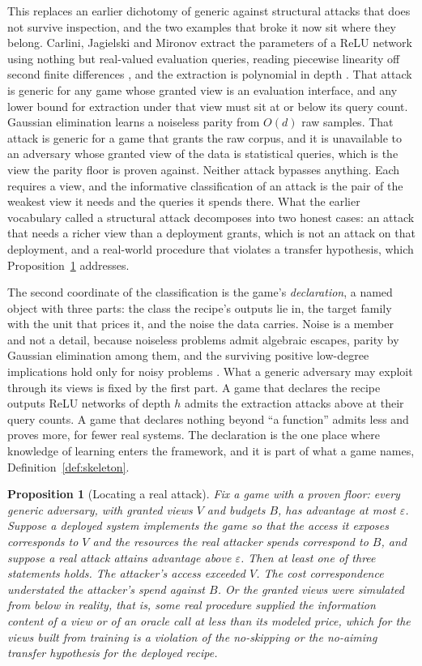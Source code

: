 \documentclass[11pt]{article}
\theoremstyle{definition}
\theoremstyle{plain}
\newtheorem{proposition}{Proposition}
\theoremstyle{remark}
\begin{document}
This replaces an earlier dichotomy of generic against structural attacks that
does not survive inspection, and the two examples that broke it now sit where
they belong. Carlini, Jagielski and Mironov extract the parameters of a ReLU
network using nothing but real-valued evaluation queries, reading piecewise
linearity off second finite differences \cite{CJM20}, and the extraction is
polynomial in depth \cite{CCHRSS24}. That attack is generic for any game whose
granted view is an evaluation interface, and any lower bound for extraction
under that view must sit at or below its query count. Gaussian elimination
learns a noiseless parity from $O(d)$ raw samples. That attack is generic for a
game that grants the raw corpus, and it is unavailable to an adversary whose
granted view of the data is statistical queries, which is the view the parity
floor is proven against. Neither attack bypasses anything. Each requires a view,
and the informative classification of an attack is the pair of the weakest view
it needs and the queries it spends there. What the earlier vocabulary called a
structural attack decomposes into two honest cases: an attack that needs a
richer view than a deployment grants, which is not an attack on that deployment,
and a real-world procedure that violates a transfer hypothesis, which
Proposition~\ref{prop:winwin} addresses.

The second coordinate of the classification is the game's \emph{declaration}, a
named object with three parts: the class the recipe's outputs lie in, the target
family with the unit that prices it, and the noise the data carries. Noise is a
member and not a detail, because noiseless problems admit algebraic escapes,
parity by Gaussian elimination among them, and the surviving positive low-degree
implications hold only for noisy problems \cite{HKKLMT26}. What a generic
adversary may exploit through its views is fixed by the first part. A game that
declares the recipe outputs ReLU networks of depth $h$ admits the extraction
attacks above at their query counts. A game that declares nothing beyond ``a
function'' admits less and proves more, for fewer real systems. The declaration
is the one place where knowledge of learning enters the framework, and it is
part of what a game names, Definition~\ref{def:skeleton}.

\begin{proposition}[Locating a real attack]
\label{prop:winwin}
Fix a game with a proven floor: every generic adversary, with granted views $V$
and budgets $B$, has advantage at most $\varepsilon$. Suppose a deployed system
implements the game so that the access it exposes corresponds to $V$ and the
resources the real attacker spends correspond to $B$, and suppose a real attack
attains advantage above $\varepsilon$. Then at least one of three statements
holds. The attacker's access exceeded $V$. The cost correspondence understated
the attacker's spend against $B$. Or the granted views were simulated from below
in reality, that is, some real procedure supplied the information content of a
view or of an oracle call at less than its modeled price, which for the views
built from training is a violation of the no-skipping or the no-aiming transfer
hypothesis for the deployed recipe.
\end{proposition}
\end{document}
